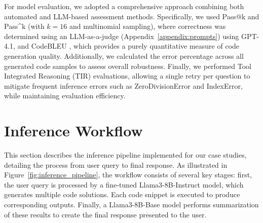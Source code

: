For model evaluation, we adopted a comprehensive approach combining both automated and LLM-based assessment methods. Specifically, we used Pass@k and Pass\textasciicircum k \citep{Levi2024SimpleModelInferenceScalingLaws} (with $k=16$ and multinomial sampling), where correctness was determined using an LLM-as-a-judge \citep{Li2025LLMJudge} (Appendix~\ref{appendix:prompts}) using GPT-4.1, and CodeBLEU \citep{Ren2020CodeBLEU}, which provides a purely quantitative measure of code generation quality. Additionally, we calculated the error percentage across all generated code samples to assess overall robustness. Finally, we performed Tool Integrated Reasoning (TIR) \citep{Fleureau2024NuminaMath} evaluations, allowing a single retry per question to mitigate frequent inference errors such as ZeroDivisionError and IndexError, while maintaining evaluation efficiency.






\section{Inference Workflow}

This section describes the inference pipeline implemented for our case studies, detailing the process from user query to final response. As illustrated in Figure~\ref{fig:inference_pipeline}, the workflow consists of several key stages: first, the user query is processed by a fine-tuned Llama3-8B-Instruct model, which generates multiple code solutions. Each code snippet is executed to produce corresponding outputs. Finally, a Llama3-8B-Base model performs summarization of these results to create the final response presented to the user.

